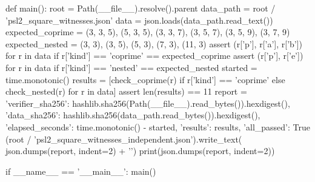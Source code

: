 \documentclass[11pt,a4paper]{article}
\begin{document}
\begin{CompleteProgram}
def main():
    root = Path(__file__).resolve().parent
    data_path = root / 'psl2_square_witnesses.json'
    data = json.loads(data_path.read_text())
    expected_coprime = {(3, 3, 5), (5, 3, 5), (3, 3, 7),
                        (3, 5, 7), (3, 5, 9), (3, 7, 9)}
    expected_nested = {(3, 3), (3, 5), (5, 3), (7, 3), (11, 3)}
    assert {(r['p'], r['a'], r['b']) for r in data if r['kind'] == 'coprime'} == expected_coprime
    assert {(r['p'], r['e']) for r in data if r['kind'] == 'nested'} == expected_nested
    started = time.monotonic()
    results = [check_coprime(r) if r['kind'] == 'coprime' else check_nested(r)
               for r in data]
    assert len(results) == 11
    report = {'verifier_sha256': hashlib.sha256(Path(__file__).read_bytes()).hexdigest(),
              'data_sha256': hashlib.sha256(data_path.read_bytes()).hexdigest(),
              'elapsed_seconds': time.monotonic() - started, 'results': results,
              'all_passed': True}
    (root / 'psl2_square_witnesses_independent.json').write_text(
        json.dumps(report, indent=2) + '\n')
    print(json.dumps(report, indent=2))


if __name__ == '__main__':
    main()
\end{CompleteProgram}
\end{document}
